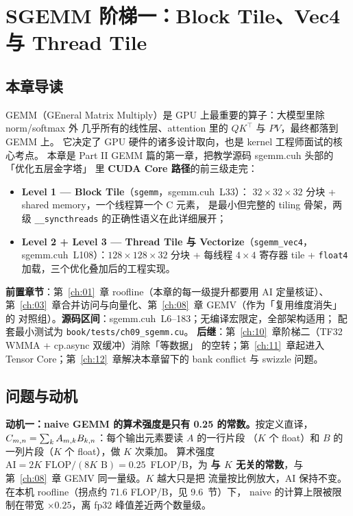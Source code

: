 \chapter{SGEMM 阶梯一：Block Tile、Vec4 与 Thread Tile}\label{ch:09}

\section{本章导读}

GEMM（GEneral Matrix Multiply）是 GPU 上最重要的算子：大模型里除 norm/softmax 外
几乎所有的线性层、attention 里的 $QK^{\top}$ 与 $PV$，最终都落到 GEMM 上。
它决定了 GPU 硬件的诸多设计取向，也是 kernel 工程师面试的核心考点。
本章是 Part II GEMM 篇的第一章，把教学源码 sgemm.cuh 头部的「优化五层金字塔」
里 \textbf{CUDA Core 路径}的前三级走完：

\begin{itemize}
  \item \textbf{Level 1 — Block Tile}（\texttt{sgemm}，sgemm.cuh~L33）：
        $32 \times 32 \times 32$ 分块 + shared memory，一个线程算一个 C 元素，
        是最小但完整的 tiling 骨架，两级 \texttt{\_\allowbreak{}\_\allowbreak{}syncthreads} 的正确性语义在此详细展开；
  \item \textbf{Level 2 + Level 3 — Thread Tile 与 Vectorize}（\texttt{sgemm\_vec4}，
        sgemm.cuh~L108）：$128 \times 128 \times 32$ 分块 + 每线程 $4 \times 4$
        寄存器 tile + \texttt{float4} 加载，三个优化叠加后的工程实现。
\end{itemize}

\textbf{前置章节}：第~\ref{ch:01}~章 roofline（本章的每一级提升都要用 AI 定量核证）、
第~\ref{ch:03}~章合并访问与向量化、第~\ref{ch:08}~章 GEMV（作为「复用维度消失」的
对照组）。\textbf{源码区间}：sgemm.cuh~L6--183；无编译宏限定，全部架构适用；
配套最小测试为 \texttt{book/\allowbreak{}tests/\allowbreak{}ch09\_\allowbreak{}sgemm.\allowbreak{}cu}。
\textbf{后继}：第~\ref{ch:10}~章阶梯二（TF32 WMMA + cp.async 双缓冲）消除「等数据」
的空转；第~\ref{ch:11}~章起进入 Tensor Core；第~\ref{ch:12}~章解决本章留下的
bank conflict 与 swizzle 问题。

\section{问题与动机}

\textbf{动机一：naive GEMM 的算术强度是只有 0.25 的常数。}按定义直译，
$C\sb{m,n} = \sum\sb{k} A\sb{m,k} B\sb{k,n}$：每个输出元素要读 $A$ 的一行片段
（$K$ 个 float）和 $B$ 的一列片段（$K$ 个 float），做 $K$ 次乘加。
算术强度 $\mathrm{AI} = 2K \text{ FLOP} / (8K \text{ B}) = 0.25$~FLOP/B，为
\textbf{与 $K$ 无关的常数}，与第~\ref{ch:08}~章 GEMV 同一量级。$K$ 越大只是把
流量按比例放大，AI 保持不变。在本机 roofline（拐点约 71.6 FLOP/B，见 9.6~节）下，
naive 的计算上限被限制在带宽 $\times 0.25$，离 fp32 峰值差近两个数量级。

